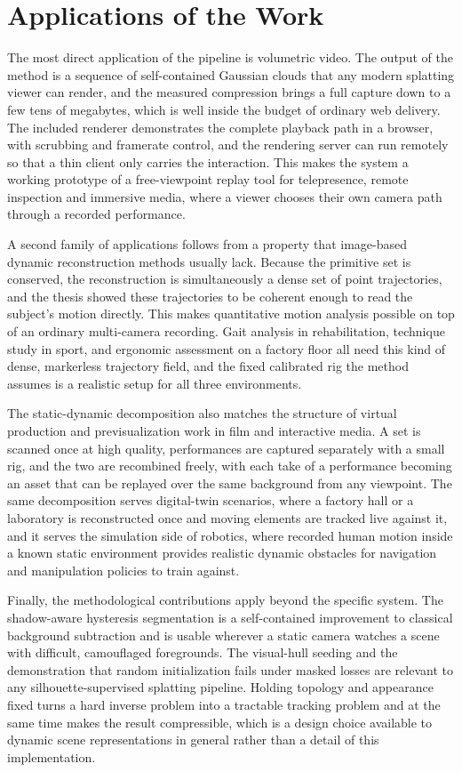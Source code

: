 \section{Applications of the Work}
\label{sec:conclusions-applications}

The most direct application of the pipeline is volumetric video. The output of the
method is a sequence of self-contained Gaussian clouds that any modern splatting
viewer can render, and the measured compression brings a full capture down to a
few tens of megabytes, which is well inside the budget of ordinary web delivery.
The included renderer demonstrates the complete playback path in a browser, with
scrubbing and framerate control, and the rendering server can run remotely so that
a thin client only carries the interaction. This makes the system a working
prototype of a free-viewpoint replay tool for telepresence, remote inspection and
immersive media, where a viewer chooses their own camera path through a recorded
performance.

A second family of applications follows from a property that image-based dynamic
reconstruction methods usually lack. Because the primitive set is conserved, the
reconstruction is simultaneously a dense set of point trajectories, and the thesis
showed these trajectories to be coherent enough to read the subject's motion
directly. This makes quantitative motion analysis possible on top of an ordinary
multi-camera recording. Gait analysis in rehabilitation, technique study in
sport, and ergonomic assessment on a factory floor all need this kind of dense,
markerless trajectory field, and the fixed calibrated rig the method
assumes is a realistic setup for all three environments.

The static-dynamic decomposition also matches the structure of virtual production
and previsualization work in film and interactive media. A set is scanned once at
high quality, performances are captured separately with a small rig, and the two
are recombined freely, with each take of a performance becoming an asset that can
be replayed over the same background from any viewpoint. The same decomposition
serves digital-twin scenarios, where a factory hall or a laboratory is
reconstructed once and moving elements are tracked live against it, and it serves
the simulation side of robotics, where recorded human motion inside a known static
environment provides realistic dynamic obstacles for navigation and manipulation
policies to train against.

Finally, the methodological contributions apply beyond the specific system. The
shadow-aware hysteresis segmentation is a self-contained improvement to classical
background subtraction and is usable wherever a static camera watches a scene with
difficult, camouflaged foregrounds. The visual-hull seeding and the demonstration
that random initialization fails under masked losses are relevant to any
silhouette-supervised splatting pipeline. Holding topology and appearance fixed
turns a hard inverse problem into a tractable tracking problem and at the same
time makes the result compressible, which is a design choice available to dynamic
scene representations in general rather than a detail of this implementation.
